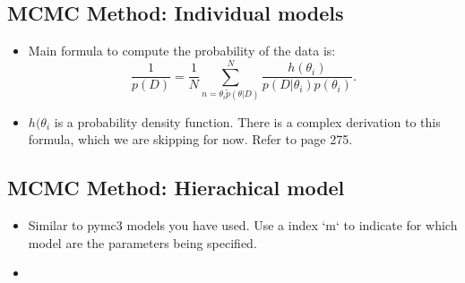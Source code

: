 \documentclass{article}
\begin{document}
\subsection{MCMC Method: Individual models}
\begin{itemize}
    \item Main formula to compute the probability of the data is:
    \[
        \frac{1}{p(D)} = \frac{1}{N} \sum_{n=\theta_{i} \tilde p(\theta|D)}^{N} \frac{h(\theta_{i})}{p(D|\theta_{i}) p(\theta_{i})} 
    .\]     
\item $h(\theta_{i}$ is a probability density function. There is a complex derivation to this formula, which we are skipping for now. Refer to page 275.
\end{itemize}
\subsection{MCMC Method: Hierachical model}
\begin{itemize}
    \item Similar to pymc3 models you have used. Use a index `m` to indicate for which model are the parameters being specified.
    \item 
\end{itemize}
\end{document}

